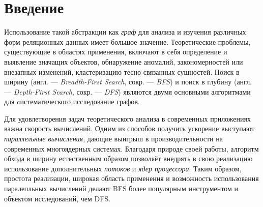 
\section*{Введение}
\label{sec:intro}
Использование такой абстракции как \textit{граф} для анализа и изучения различных форм реляционных данных имеет большое значение. Теоретические проблемы, существующие в областях применения, включают в себя определение и выявление значащих объектов, обнаружение аномалий, закономерностей или внезапных изменений, кластеризацию тесно связанных сущностей. Поиск в ширину (англ. --- \textit{Breadth-First Search}, сокр. --- \textit{BFS}) и поиск в глубину (англ. --- \textit{Depth-First Search}, сокр. --- \textit{DFS}) являются двумя основными алгоритмами для cистематического исследование графов. 

Для удовлетворения задач теоретического анализа в современных приложениях важна скорость вычислений. Одним из способов получить ускорение выступают \textit{параллельные вычисления}, дающие выигрыш в производительности на современных многоядерных системах. Благодаря природе своей работы, алгоритм обхода в ширину естественным образом позволяёт внедрять в свою реализацию использование дополнительных \textit{потоков} и \textit{ядер процессора}. Таким образом, простота реализации, широкая область применения и возможность использования паралелльных вычислений делают BFS более популярным инструментом и объектом исследований, чем DFS.